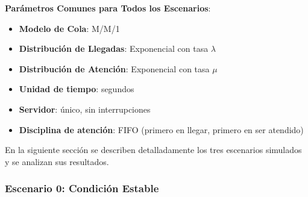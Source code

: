 \documentclass{article}
\begin{document}
\textbf{Parámetros Comunes para Todos los Escenarios}:

\begin{itemize}
  \item \textbf{Modelo de Cola}: M/M/1
  \item \textbf{Distribución de Llegadas}: Exponencial con tasa \(\lambda\)
  \item \textbf{Distribución de Atención}: Exponencial con tasa \(\mu\)
  \item \textbf{Unidad de tiempo}: segundos
  \item \textbf{Servidor}: único, sin interrupciones
  \item \textbf{Disciplina de atención}: FIFO (primero en llegar, primero en ser atendido)
\end{itemize}

En la siguiente sección se describen detalladamente los tres escenarios simulados y se analizan sus resultados.

\subsubsection{Escenario 0: Condición Estable}
\end{document}

